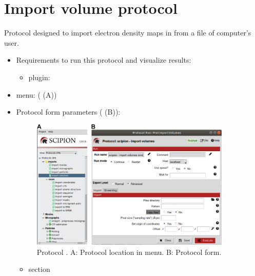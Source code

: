 \section{Import volume protocol}
\label{app:importVolume}%
Protocol designed to import electron density maps in \scipion from a file of computer's user.
   
 \begin{itemize}
  \item Requirements to run this protocol and visualize results:
    \begin{itemize}
        \item \scipion plugin: 
    \end{itemize}
  \item \scipion menu:
   ( (A))
  
  \item Protocol form parameters ( (B)):
  
  \begin{figure}[H]
    \centering 
    \captionsetup{width=.7\linewidth} 
    \includegraphics[width=0.90\textwidth]{Images_appendix/Fig100.pdf}
    \caption{Protocol . A: Protocol location in \scipion menu. B: Protocol form.}
    \label{fig:app_protocol_volume_1}
   \end{figure}
  
  \begin{itemize}
   \item {} section
  


\end{itemize}
\end{itemize}
